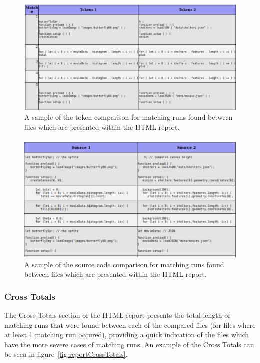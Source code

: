 \documentclass[11pt, a4paper]{article}
\begin{document}
\begin{figure}
\begin{center}
\includegraphics[scale=0.8]{ReportTokens}
\end{center}
\caption{\label{fig:reportTokens}A sample of the token comparison for matching runs found between files which are presented within the HTML report.}
\end{figure}

\begin{figure}
\begin{center}
\includegraphics[scale=0.86]{ReportSources}
\end{center}
\caption{\label{fig:reportSources}A sample of the source code comparison for matching runs found between files which are presented within the HTML report.}
\end{figure}

\subsubsection{Cross Totals}

The Cross Totals section of the HTML report presents the total length of matching runs that were found between each of the compared files (for files where at least 1 matching run occured), providing a quick indication of the files which have the more severe cases of matching runs. An example of the Cross Totals can be seen in figure~\ref{fig:reportCrossTotals}.
\end{document}
